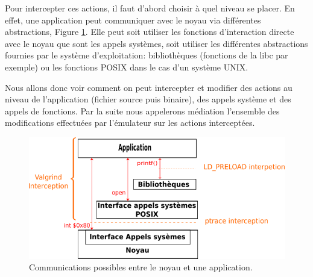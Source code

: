 Pour intercepter ces actions, il faut d'abord choisir à quel niveau se placer.
En effet, une application peut communiquer avec le noyau via différentes
abstractions, Figure \ref{AS_Communication}. Elle peut soit utiliser les
fonctions d'interaction directe avec le noyau que sont les appels systèmes, soit
utiliser les différentes abstractions fournies par le système d'exploitation:
bibliothèques (fonctions de la libc par exemple) ou les fonctions POSIX dans le
cas d'un système UNIX.

Nous allons donc voir comment on peut intercepter et modifier des actions au
niveau de l'application (fichier source puis binaire), des appels système et
des appels de fonctions. Par la suite nous appelerons médiation l'ensemble des
modifications effectuées par l'émulateur sur les actions interceptées.

\begin{figure}[H]
 \centering
 \includegraphics[scale=0.75]{Pictures/png/Communication_application_noyau_v3.png}
 \caption{Communications possibles entre le noyau et une application.}
 \label{AS_Communication}
\end{figure}
